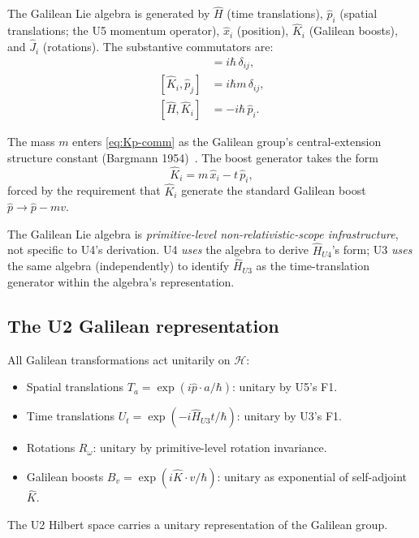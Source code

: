 \documentclass[11pt,a4paper]{article}
\begin{document}
The Galilean Lie algebra is generated by $\hat{H}$ (time translations), $\hat{p}_i$ (spatial translations; the U5 momentum operator), $\hat{x}_i$ (position), $\hat{K}_i$ (Galilean boosts), and $\hat{J}_i$ (rotations). The substantive commutators are:
\begin{align}
[\hat{x}_i, \hat{p}_j] &= i\hbar \, \delta_{ij}, \label{eq:xp-comm} \\
[\hat{K}_i, \hat{p}_j] &= i\hbar m \, \delta_{ij}, \label{eq:Kp-comm} \\
[\hat{H}, \hat{K}_i] &= -i\hbar \, \hat{p}_i. \label{eq:HK-comm}
\end{align}

The mass $m$ enters \eqref{eq:Kp-comm} as the Galilean group's central-extension structure constant (Bargmann 1954)~\cite{bargmann}. The boost generator takes the form
\begin{equation}
\hat{K}_i = m \, \hat{x}_i - t \, \hat{p}_i, \label{eq:K-form}
\end{equation}
forced by the requirement that $\hat{K}_i$ generate the standard Galilean boost $\hat{p} \to \hat{p} - mv$.

The Galilean Lie algebra is \emph{primitive-level non-relativistic-scope infrastructure}, not specific to U4's derivation. U4 \emph{uses} the algebra to derive $\hat{H}_{U4}$'s form; U3 \emph{uses} the same algebra (independently) to identify $\hat{H}_{U3}$ as the time-translation generator within the algebra's representation.

\subsection{The U2 Galilean representation}

All Galilean transformations act unitarily on $\mathcal{H}$:

\begin{itemize}
  \item Spatial translations $T_a = \exp(i\hat{p}\cdot a/\hbar)$: unitary by U5's F1.
  \item Time translations $U_t = \exp(-i\hat{H}_{U3} t/\hbar)$: unitary by U3's F1.
  \item Rotations $R_\omega$: unitary by primitive-level rotation invariance.
  \item Galilean boosts $B_v = \exp(i\hat{K}\cdot v/\hbar)$: unitary as exponential of self-adjoint $\hat{K}$.
\end{itemize}

The U2 Hilbert space carries a unitary representation of the Galilean group.
\end{document}
